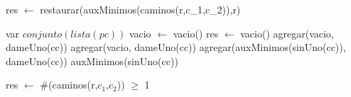 \begin{algorithm}\phantom{[H]}
\begin{algorithmic}[1]
  \State res $\gets$ restaurar(auxMinimos(caminos(r,c_{1},c_{2})),r)  
\EndFunction
\end{algorithmic}
\end{algorithm}

\begin{algorithm}\phantom{[H]}
\begin{algorithmic}[1]
 
\State var $conjunto(lista(pc))$ vacio $\gets$ vacio()  
    
      \State res $\gets$ vacio() 
    \Else
       
        \State agregar(vacio, dameUno(cc))  
      \Else
          
          \State agregar(vacio, dameUno(cc))  
        \Else
            \State {}
            \State agregar(auxMinimos(sinUno(cc)), dameUno(cc)) 
          \Else
            \State auxMinimos(sinUno(cc)) 
          \EndIf
        \EndIf
      \EndIf
  \EndIf
\EndFunction
\end{algorithmic}
\end{algorithm}

\begin{algorithm}\phantom{[H]}
\begin{algorithmic}[1]
  \State res $\gets$ $\#$(caminos(r,$c_{1}$,$c_{2}$)) $\geq$ 1 
\EndFunction
\end{algorithmic}
\end{algorithm}
























